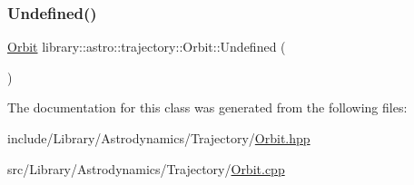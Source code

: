 \mbox{\label{classlibrary_1_1astro_1_1trajectory_1_1_orbit_a1623802ee44bab50e24f3c1979bb5001}} 
\subsubsection{\texorpdfstring{Undefined()}{Undefined()}}
{\footnotesize\ttfamily \hyperlink{classlibrary_1_1astro_1_1trajectory_1_1_orbit}{Orbit} library\+::astro\+::trajectory\+::\+Orbit\+::\+Undefined (\begin{DoxyParamCaption}{ }\end{DoxyParamCaption})\hspace{0.3cm}{\ttfamily [static]}}



The documentation for this class was generated from the following files\+:\begin{DoxyCompactItemize}
\item 
include/\+Library/\+Astrodynamics/\+Trajectory/\hyperlink{_orbit_8hpp}{Orbit.\+hpp}\item 
src/\+Library/\+Astrodynamics/\+Trajectory/\hyperlink{_orbit_8cpp}{Orbit.\+cpp}\end{DoxyCompactItemize}
